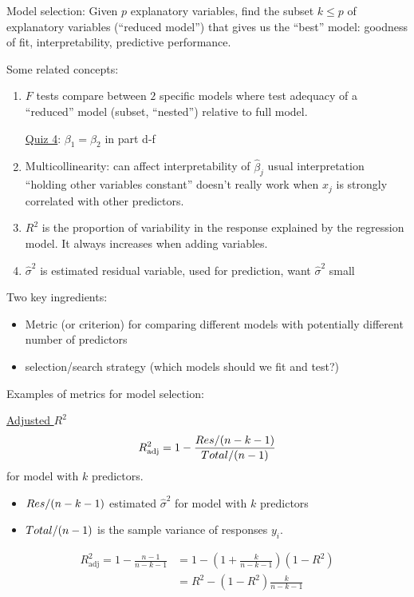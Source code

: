 Model selection:
Given $ p $ explanatory variables, find the subset
$ k\leqslant p $ of explanatory variables
(``reduced model'') that gives us
the ``best'' model: goodness of fit,
interpretability, predictive performance.

Some related concepts:
\begin{enumerate}
      \item $ F $ tests compare between $ 2 $
            specific models where test adequacy of
            a ``reduced'' model (subset, ``nested'')
            relative to full model.

            \underline{Quiz 4}: $ \beta_1=\beta_2 $
            in part d-f
      \item Multicollinearity: can affect interpretability
            of $ \hat{\beta}_j $ usual interpretation
            ``holding other variables constant''
            doesn't really work when $ x_j $ is
            strongly correlated with other predictors.
      \item $ R^2 $ is the proportion
            of variability in the response explained by
            the regression model. It always increases
            when adding variables.
      \item $ \hat{\sigma}^2 $ is estimated residual variable,
            used for prediction, want $ \hat{\sigma}^2 $ small
\end{enumerate}
Two key ingredients:
\begin{itemize}
      \item Metric (or criterion) for comparing
            different models with potentially different number
            of predictors
      \item selection/search strategy (which models
            should we fit and test?)
\end{itemize}
Examples of metrics for model selection:

\underline{Adjusted $ R^2 $}
\[ R^2_{\text{adj}}=1-\frac{\relax{Res}/(n-k-1)}{
            \relax{Total}/(n-1)
      } \]
for model with $ k $ predictors.
\begin{itemize}
      \item $ \relax{Res}/(n-k-1) $
            estimated $ \hat{\sigma}^2 $
            for model with $ k $ predictors
      \item $ \relax{Total}/(n-1) $ is the sample variance
            of responses $ y_i $.
\end{itemize}
\begin{align*}
      R^2_{\text{adj}}=1-\frac{n-1}{n-k-1}
       & = 1-\left( 1+\frac{k}{n-k-1} \right)
      (1-R^2)                                 \\
       & =R^2-(1-R^2)\frac{k}{n-k-1}
\end{align*}

